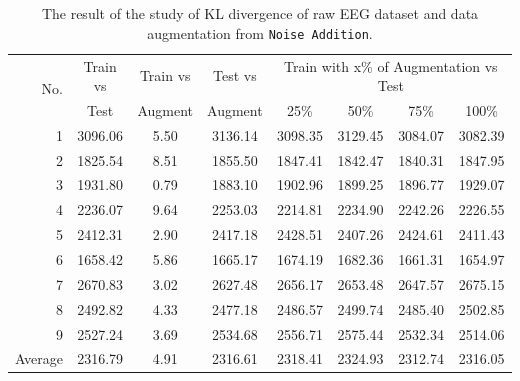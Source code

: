 \begin{table}[ht!]
    \centering
    \caption[The result of KL divergence]{The result of the study of KL divergence of raw EEG dataset and data augmentation from \texttt{Noise Addition}.}
    \label{tab:KL-noiseadd}
        {\small\begin{tabular}{rccccccc}
        \hline
        \multirow{2}{*}{No.} & Train vs & Train vs & Test vs & \multicolumn{4}{c}{Train with x\% of Augmentation vs Test} \\ 
        \cline{5-8} 
                             & Test     & Augment  & Augment & 25\%          & 50\%         & 75\%         & 100\%        \\
        \hline
        1                    & 3096.06  & 5.50     & 3136.14 & 3098.35       & 3129.45      & 3084.07      & 3082.39      \\
        2                    & 1825.54  & 8.51     & 1855.50 & 1847.41       & 1842.47      & 1840.31      & 1847.95      \\
        3                    & 1931.80  & 0.79     & 1883.10 & 1902.96       & 1899.25      & 1896.77      & 1929.07      \\
        4                    & 2236.07  & 9.64     & 2253.03 & 2214.81       & 2234.90      & 2242.26      & 2226.55      \\
        5                    & 2412.31  & 2.90     & 2417.18 & 2428.51       & 2407.26      & 2424.61      & 2411.43      \\
        6                    & 1658.42  & 5.86     & 1665.17 & 1674.19       & 1682.36      & 1661.31      & 1654.97      \\
        7                    & 2670.83  & 3.02     & 2627.48 & 2656.17       & 2653.48      & 2647.57      & 2675.15      \\
        8                    & 2492.82  & 4.33     & 2477.18 & 2486.57       & 2499.74      & 2485.40      & 2502.85      \\
        9                    & 2527.24  & 3.69     & 2534.68 & 2556.71       & 2575.44      & 2532.34      & 2514.06      \\\hline
        Average              & 2316.79  & 4.91     & 2316.61 & 2318.41       & 2324.93      & 2312.74      & 2316.05      \\
        \hline
        \end{tabular}}
\end{table}

